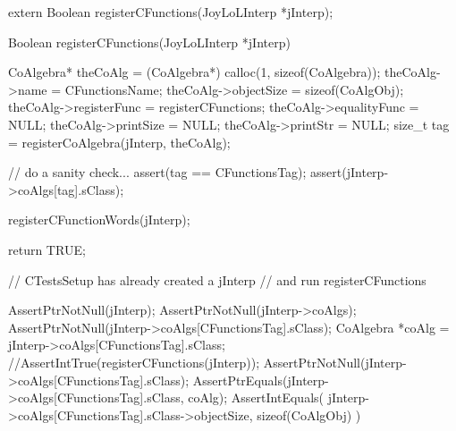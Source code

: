 \stoptyping

\startTestSuite[registerCFunctions]

\startCHeader
extern Boolean registerCFunctions(JoyLoLInterp *jInterp);
\stopCHeader
{}

\startCCode
Boolean registerCFunctions(JoyLoLInterp *jInterp) {
  CoAlgebra* theCoAlg    = (CoAlgebra*) calloc(1, sizeof(CoAlgebra));
  theCoAlg->name         = CFunctionsName;
  theCoAlg->objectSize   = sizeof(CoAlgObj);
  theCoAlg->registerFunc = registerCFunctions;
  theCoAlg->equalityFunc = NULL;
  theCoAlg->printSize    = NULL;
  theCoAlg->printStr     = NULL;
  size_t tag = registerCoAlgebra(jInterp, theCoAlg);

  // do a sanity check...
  assert(tag == CFunctionsTag);
  assert(jInterp->coAlgs[tag].sClass);
  
  registerCFunctionWords(jInterp);
  
  return TRUE;
}
\stopCCode


\startCTest
  // CTestsSetup has already created a jInterp
  // and run registerCFunctions
  
  AssertPtrNotNull(jInterp);
  AssertPtrNotNull(jInterp->coAlgs);
  AssertPtrNotNull(jInterp->coAlgs[CFunctionsTag].sClass);
  CoAlgebra *coAlg = jInterp->coAlgs[CFunctionsTag].sClass;
  //AssertIntTrue(registerCFunctions(jInterp));
  AssertPtrNotNull(jInterp->coAlgs[CFunctionsTag].sClass);
  AssertPtrEquals(jInterp->coAlgs[CFunctionsTag].sClass, coAlg);
  AssertIntEquals(
    jInterp->coAlgs[CFunctionsTag].sClass->objectSize,
    sizeof(CoAlgObj)
  )
\stopCTest
\stopTestCase
\stopTestSuite